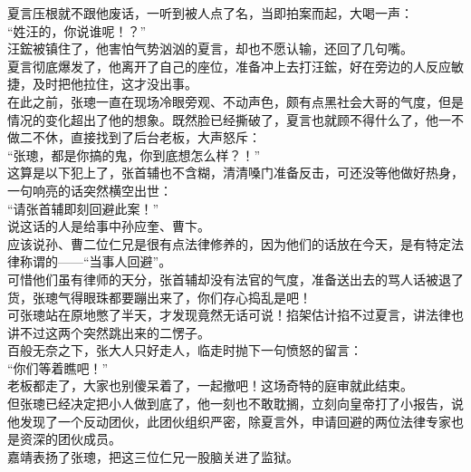 \begin{multicols}{\theparacolNo}
夏言压根就不跟他废话，一听到被人点了名，当即拍案而起，大喝一声：\\

“姓汪的，你说谁呢！？”\\

汪鋐被镇住了，他害怕气势汹汹的夏言，却也不愿认输，还回了几句嘴。\\

夏言彻底爆发了，他离开了自己的座位，准备冲上去打汪鋐，好在旁边的人反应敏捷，及时把他拉住，这才没出事。\\

在此之前，张璁一直在现场冷眼旁观、不动声色，颇有点黑社会大哥的气度，但是情况的变化超出了他的想象。既然脸已经撕破了，夏言也就顾不得什么了，他一不做二不休，直接找到了后台老板，大声怒斥：\\

“张璁，都是你搞的鬼，你到底想怎么样？！”\\

这算是以下犯上了，张首辅也不含糊，清清嗓门准备反击，可还没等他做好热身，一句响亮的话突然横空出世：\\

“请张首辅即刻回避此案！”\\

说这话的人是给事中孙应奎、曹卞。\\

应该说孙、曹二位仁兄是很有点法律修养的，因为他们的话放在今天，是有特定法律称谓的——“当事人回避”。\\

可惜他们虽有律师的天分，张首辅却没有法官的气度，准备送出去的骂人话被退了货，张璁气得眼珠都要蹦出来了，你们存心捣乱是吧！\\

可张璁站在原地憋了半天，才发现竟然无话可说！掐架估计掐不过夏言，讲法律也讲不过这两个突然跳出来的二愣子。\\

百般无奈之下，张大人只好走人，临走时抛下一句愤怒的留言：\\

“你们等着瞧吧！”\\

老板都走了，大家也别傻呆着了，一起撤吧！这场奇特的庭审就此结束。\\

但张璁已经决定把小人做到底了，他一刻也不敢耽搁，立刻向皇帝打了小报告，说他发现了一个反动团伙，此团伙组织严密，除夏言外，申请回避的两位法律专家也是资深的团伙成员。\\

嘉靖表扬了张璁，把这三位仁兄一股脑关进了监狱。\\


\end{multicols}
